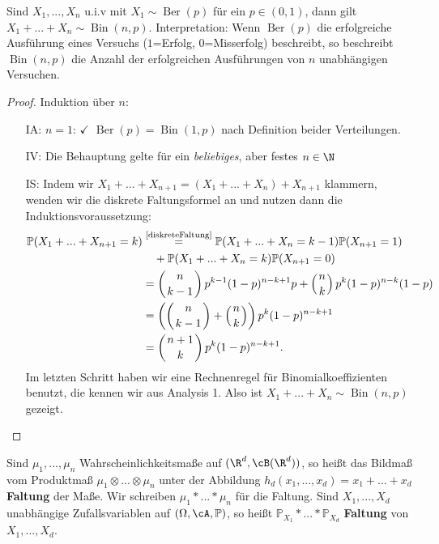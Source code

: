 \begin{beispiel}
	Sind $X_1,...,X_n$ u.i.v mit $X_1 \sim \operatorname{Ber}(p)$ f\"ur ein $p\in (0,1)$, dann gilt $X_1+...+X_n \sim \operatorname{Bin}(n,p)$. Interpretation: Wenn $\operatorname{Ber}(p)$ die erfolgreiche Ausf\"uhrung eines Versuchs ($1$=Erfolg, $0$=Misserfolg) beschreibt, so beschreibt $\operatorname{Bin}(n,p)$ die Anzahl der erfolgreichen Ausf\"uhrungen von $n$ unabhängigen Versuchen.
\end{beispiel}

\begin{proof}
	Induktion über $n$:
	\begin{itemize}
		\item[IA:] $n=1$: $\checkmark$ $\operatorname{Ber}(p) = \operatorname{Bin}(1,p)$ nach Definition beider Verteilungen.
		\item[IV:] Die Behauptung gelte für ein \textit{beliebiges}, aber festes $n \in \N$
		\item[IS:] Indem wir $X_1+...+X_{n+1}=(X_1+...+X_n)+X_{n+1}$ klammern, wenden wir die diskrete Faltungsformel an und nutzen dann die Induktionsvoraussetzung:
		 \begin{align*}
			\mathbb{P}(X_1+...+X_{n+1} = k)&
			\overset{\text{\ref{diskreteFaltung}}}{=} \mathbb{P}(X_1+...+X_{n} = k-1) \mathbb{P}(X_{n+1} = 1)\\
			&\quad + \mathbb{P}(X_1+...+X_{n} = k) \mathbb{P}(X_{n+1} = 0)\\
			&= \left(  n\atop{k-1}\right) p^{k-1} (1-p)^{n-k+1}p + \left( n\atop k\right) p^{k} (1-p)^{n-k}(1-p) \\
			&= \left(\left( n\atop {k-1} \right) + \left( n\atop  k\right)\right) p^k (1-p)^{n-k+1}\\
			& = \left({n + 1}\atop  k \right) p^k (1-p)^{n-k+1}.
		\end{align*}
		Im letzten Schritt haben wir eine Rechnenregel f\"ur Binomialkoeffizienten benutzt, die kennen wir aus Analysis 1. Also ist $X_1+...+X_n \sim \operatorname{Bin}(n,p)$ gezeigt. 
	\end{itemize} 
\end{proof}

\begin{deff}
	Sind $\mu_1,...,\mu_n$ Wahrscheinlichkeitsmaße auf $(\R^d, \cB(\R^d))$, so heißt das Bildmaß vom Produktmaß $\mu_1 \otimes ... \otimes \mu_n$ unter der Abbildung $h_d(x_1,...,x_d) = x_1+...+x_d$ \textbf{Faltung} der Maße. Wir schreiben $\mu_1 *...* \mu_n$ für die Faltung.
	Sind $X_1,...,X_d$ unabhängige Zufallsvariablen auf $(\Omega, \cA, \mathbb{P})$, so heißt $\mathbb{P}_{X_1} *...*\mathbb{P}_{X_d}$ \textbf{Faltung} von $X_1, ..., X_d$.
\end{deff}

